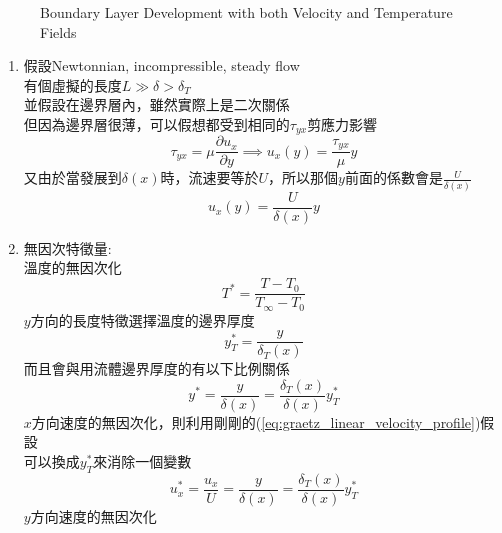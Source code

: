 \documentclass[../main.tex]{subfiles}
\begin{document}
\begin{itemize}
\begin{figure}[H]
    \caption{Boundary Layer Development with both Velocity and Temperature Fields}
  \end{figure}
  \begin{enumerate}
    \item 假設Newtonnian, incompressible, steady flow\\
    有個虛擬的長度$L\gg \delta >\delta_T$\\
    並假設在邊界層內，雖然實際上是二次關係\\
    但因為邊界層很薄，可以假想都受到相同的$\tau_{yx}$剪應力影響
    \begin{equation}
      \tau_{yx} = \mu \frac{\partial u_x}{\partial y} \implies u_x(y) = \frac{\tau_{yx}}{\mu} y \label{eq:graetz_linear_velocity_profile}
    \end{equation}
    又由於當發展到$\delta(x)$時，流速要等於$U$，所以那個$y$前面的係數會是$\frac{U}{\delta(x)}$
    \begin{equation}
      u_x(y) = \frac{U}{\delta(x)} y
    \end{equation}
    \item 無因次特徵量:\\
    溫度的無因次化
    \begin{equation}
      T^\ast = \frac{T - T_0}{T_\infty - T_0}
    \end{equation}
    $y$方向的長度特徵選擇溫度的邊界厚度
    \begin{equation}
      y_T^\ast = \frac{y}{\delta_T(x)}
    \end{equation}
    而且會與用流體邊界厚度的有以下比例關係
    \begin{equation}
      y^\ast = \frac{y}{\delta(x)} = \frac{\delta_T(x)}{\delta(x)} y_T^\ast
    \end{equation}
    $x$方向速度的無因次化，則利用剛剛的(\ref{eq:graetz_linear_velocity_profile})假設\\
    可以換成$y_T^\ast$來消除一個變數
    \begin{equation}
      u_x^\ast = \frac{u_x}{U} = \frac{y}{\delta(x)} = \frac{\delta_T(x)}{\delta(x)} y_T^\ast \label{eq:graetz_ux_dimensionless}
    \end{equation}
    $y$方向速度的無因次化\\

\end{enumerate}
\end{itemize}
\end{document}
